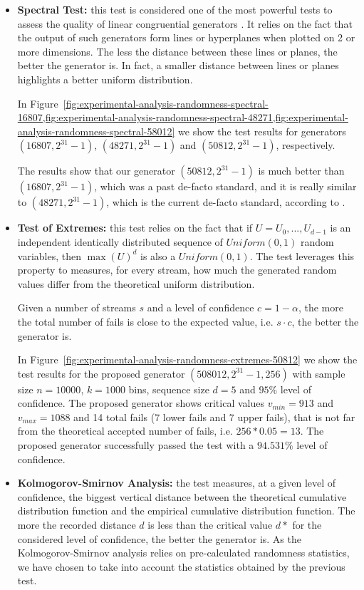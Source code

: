 \begin{itemize}
	\item \textbf{Spectral Test:} this test is considered one of the most powerful tests to assess the quality of linear congruential generators \cite{knuth1981art}. It relies on the fact that the output of such generators form lines or hyperplanes when plotted on 2 or more dimensions. The less the distance between these lines or planes, the better the generator is. In fact, a smaller distance between lines or planes highlights a better uniform distribution.
	
	In Figure~\ref{fig:experimental-analysis-randomness-spectral-16807,fig:experimental-analysis-randomness-spectral-48271,fig:experimental-analysis-randomness-spectral-58012} we show the test results for generators $(16807,2^{31}-1)$, $(48271,2^{31}-1)$ and $(50812,2^{31}-1)$, respectively.
	
	The results show that our generator $(50812,2^{31}-1)$ is much better than $(16807, 2^{31}-1)$, which was a past de-facto standard, and it is really similar to $(48271,2^{31}-1)$, which is the current de-facto standard, according to \cite{leemis2006discrete}.
	
	\item \textbf{Test of Extremes:} this test relies on the fact that if $U=U_{0},...,U_{d-1}$ is an independent identically distributed sequence of $Uniform(0,1)$ random variables, then $\max(U)^{d}$ is also a $Uniform(0,1)$. The test leverages this property to measures, for every stream, how much the generated random values differ from the theoretical uniform distribution.
	
	Given a number of streams $s$ and a level of confidence $c=1-\alpha$, the more the total number of fails is close to the expected value, i.e. $s \cdot c$, the better the generator is.
	
	In Figure~\ref{fig:experimental-analysis-randomness-extremes-50812} we show the test results for the proposed generator $(508012,2^{31}-1, 256)$ with sample size $n=10000$, $k=1000$ bins, sequence size $d=5$ and $95\%$ level of confidence.
	The proposed generator shows critical values $v_{min}=913$ and $v_{max}=1088$ and 14 total fails (7 lower fails and 7 upper fails), that is not far from the theoretical accepted number of fails, i.e. $256*0.05=13$.
	The proposed generator successfully passed the test with a $94.531\%$ level of confidence.
	
	\item \textbf{Kolmogorov-Smirnov Analysis:} the test measures, at a given level of confidence, the biggest vertical distance between the theoretical cumulative distribution function and the empirical cumulative distribution function.
	The more the recorded distance $d$ is less than the critical value $d*$ for the considered level of confidence, the better the generator is.
	As the Kolmogorov-Smirnov analysis relies on pre-calculated randomness statistics, we have chosen to take into account the statistics obtained by the previous test.
	

\end{itemize}
